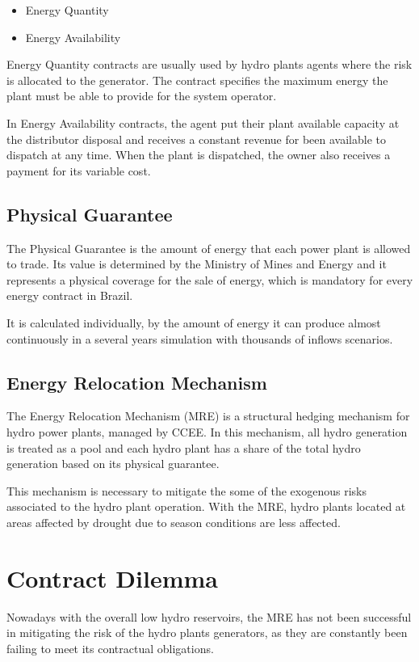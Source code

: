 \documentclass[a4paper]{IEEEtran}
\begin{document}
\begin{itemize}
	\item Energy Quantity 
	\item Energy Availability
\end{itemize}

Energy Quantity contracts are usually used by hydro plants agents where the risk is allocated to the generator. The contract specifies the maximum energy the plant must be able to provide for the system operator.

In Energy Availability contracts, the agent put their plant available capacity at the distributor disposal and receives a constant revenue for been available to dispatch at any time. When the plant is dispatched, the owner also receives a payment for its variable cost.

\subsection{Physical Guarantee}
The Physical Guarantee is the amount of energy that each power plant is allowed to trade. Its value is determined by the Ministry of Mines and Energy and it represents a physical coverage for the sale of energy, which is mandatory for every energy contract in Brazil. 

It is calculated individually, by the amount of energy it can produce almost continuously in a several years simulation with thousands of inflows scenarios.

\subsection{Energy Relocation Mechanism}
The Energy Relocation Mechanism (MRE) is a structural hedging mechanism for hydro power plants, managed by CCEE. In this mechanism, all hydro generation is treated as a pool and each hydro plant has a share of the total hydro generation based on its physical guarantee.

This mechanism is necessary to mitigate the some of the exogenous risks associated to the hydro plant operation. With the MRE, hydro plants located at areas affected by drought due to season conditions are less affected. 

\section{Contract Dilemma}
Nowadays with the overall low hydro reservoirs, the MRE has not been successful in mitigating the risk of the hydro plants generators, as they are constantly been failing to meet its contractual obligations. 
\end{document}
